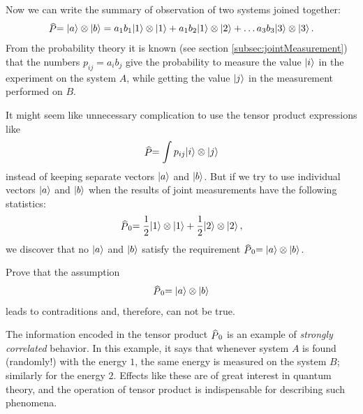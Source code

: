 Now we can write the summary of observation of two systems joined together:
\[
\op{P} = \ket{a}\otimes\ket{b}=a_1b_1 \ket{1}\otimes\ket{1}+a_1b_2 \ket{1}\otimes\ket{2}+\ldots a_3b_3 \ket{3}\otimes\ket{3}\,.
\]
From the probability theory it is known (see section \ref{subsec:jointMeasurement}) that the numbers $p_{ij}=a_ib_j$ give the probability to measure the value $|{i}\rangle$ in the experiment on the system $A$, while getting the value $|{j}\rangle$ in the measurement performed on $B$.

It might seem like unnecessary complication to use the tensor product expressions like
\[
\op{P} = \int p_{ij}\ket{i}\otimes\ket{j}
\]
instead of keeping separate vectors $|{a}\rangle$ and $|{b}\rangle$. But if we try to use individual vectors $|{a}\rangle$ and $|{b}\rangle$ when the results of joint measurements have the following statistics:
\[
\op{P}_0 = \frac{1}{2} \ket{1}\otimes\ket{1}+\frac{1}{2} \ket{2}\otimes\ket{2}\,,
\]
we discover that no $|{a}\rangle$ and $|{b}\rangle$ satisfy the requirement $\op{P}_0=\ket{a}\otimes\ket{b}$.
\begin{exercise}
	Prove that the assumption 
	\[
	\op{P}_0=\ket{a}\otimes\ket{b}
	\]
	leads to contraditions and, therefore, can not be true.	
\end{exercise}
The information encoded in the tensor product $\op{P}_0$ is an example of \emph{strongly correlated} behavior. In this example, it says that whenever system $A$ is found (randomly!) with the energy $1$, the same energy is measured on the system $B$; similarly for the energy $2$. Effects like these are of great interest in quantum theory, and the operation of tensor product is indispensable for describing such phenomena.


